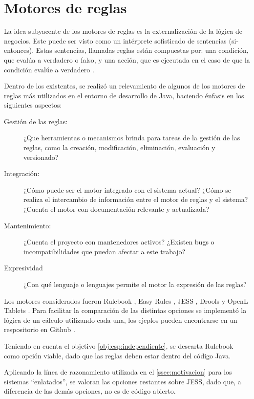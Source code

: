 \section{Motores de reglas}\label{sec:motores}

La idea subyacente de los motores de reglas es la externalización de la lógica de negocios. Este puede ser visto como un intérprete sofisticado de sentencias  (si-entonces). Estas sentencias, llamadas reglas están compuestas por: una condición, que evalúa a verdadero o falso, y una acción, que es ejecutada en el caso de que la condición evalúe a verdadero \cite{qusay2005jsr94}.

Dentro de los existentes, se realizó un relevamiento de algunos de los motores de reglas más utilizados en el entorno de desarrollo de Java, haciendo énfasis en los siguientes aspectos:
\begin{description}
    \item[Gestión de las reglas:] 
    ¿Que herramientas o mecanismos brinda para tareas de la gestión de las reglas, como la creación, modificación, eliminación, evaluación y versionado?
    \item[Integración:]
    ¿Cómo puede ser el motor integrado con el sistema actual? ¿Cómo se realiza el intercambio de información entre el motor de reglas y el sistema? ¿Cuenta el motor con documentación relevante y actualizada?
    \item[Mantenimiento:]
    ¿Cuenta el proyecto con mantenedores activos? ¿Existen bugs o incompatibilidades que puedan afectar a este trabajo?
    \item[Expresividad]
    ¿Con qué lenguaje o lenguajes permite el motor la expresión de las reglas?
\end{description}

Los motores considerados fueron Rulebook \cite{rulebook}, Easy Rules \cite{easy-rules}, JESS \cite{jess}, Drools \cite{drools} y OpenL Tablets \cite{openl-reference}. Para facilitar la comparación de las distintas opciones se implementó la lógica de un cálculo utilizando cada una, los ejeplos pueden encontrarse en un respositorio en Github \cite{ejemplos}.

Teniendo en cuenta el objetivo \ref{obj:esp:independiente}, se descarta Rulebook como opción viable, dado que las reglas deben estar dentro del código Java.

Aplicando la línea de razonamiento utilizada en el \cref{ssec:motivacion} para los sistemas ``enlatados'', se valoran las opciones restantes sobre JESS, dado que, a diferencia de las demás opciones, no es de código abierto.


